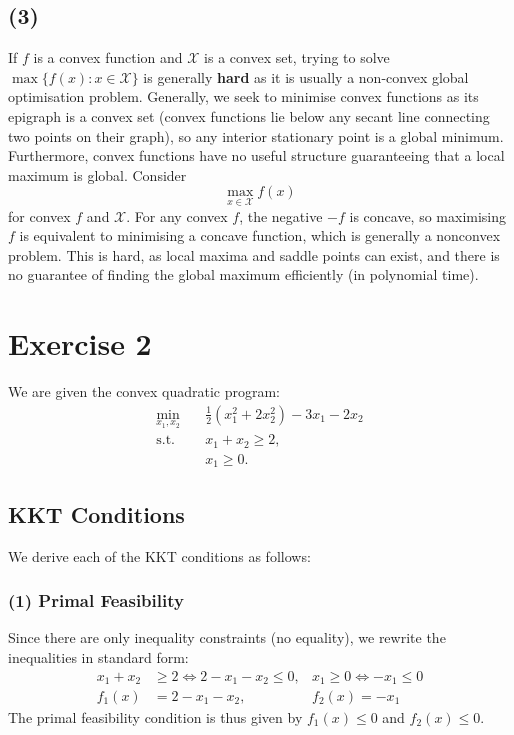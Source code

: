 \documentclass[12pt]{article}
\begin{document}
\subsection*{(3)}

If $f$ is a convex function and $\mathcal{X}$ is a convex set, trying to solve $\max \{f(x): x \in \mathcal{X}\}$ is generally \textbf{hard} as it is usually a non-convex global optimisation problem. Generally, we seek to minimise convex functions as its epigraph is a convex set (convex functions lie below any secant line connecting two points on their graph), so any interior stationary point is a global minimum. Furthermore, convex functions have no useful structure guaranteeing that a local maximum is global. Consider \begin{equation*}
    \max _{x \in \mathcal{X}} f(x)
\end{equation*} for convex $f$ and $\mathcal{X}$. For any convex $f$, the negative $-f$ is concave, so maximising $f$ is equivalent to minimising a concave function, which is generally a nonconvex problem. This is hard, as local maxima and saddle points can exist, and there is no guarantee of finding the global maximum efficiently (in polynomial time).

\section*{Exercise 2}
We are given the convex quadratic program: \begin{align*}
    \min_{x_{1}, x_{2}} \quad & \frac{1}{2} (x_{1}^2 + 2x_{2}^2)- 3 x_{1} -2 x_{2} \\ 
    \text{s.t. } \; & x_{1} + x_{2} \geq 2, \\ 
    & x_{1} \geq 0.
\end{align*} 

\subsection*{KKT Conditions} We derive each of the KKT conditions as follows: 

\subsubsection*{(1) Primal Feasibility}

Since there are only inequality constraints (no equality), we rewrite the inequalities in standard form: \begin{align*}
    x_{1} + x_{2} & \geq 2 \Longleftrightarrow 2 - x_{1} - x_{2} \leq 0, & x_{1} \geq 0 \Longleftrightarrow -x_{1} \leq 0 \\ 
    f_{1}(x) &= 2 - x_{1} - x_{2}, & f_{2}(x) = -x_{1}
\end{align*} The primal feasibility condition is thus given by $f_{1}(x) \leq 0$ and $f_{2}(x) \leq 0$. 
\end{document}
